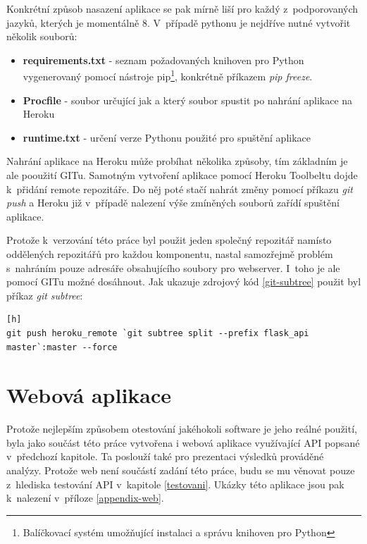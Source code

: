 \documentclass[thesis=B,czech]{FITthesis}[2012/06/26]
\begin{document}
Konkrétní způsob nasazení aplikace se pak mírně liší pro každý z~podporovaných jazyků, kterých je momentálně 8. V~případě pythonu je nejdříve nutné vytvořit několik souborů:

\begin{itemize}
\item \textbf{requirements.txt} - seznam požadovaných knihoven pro Python vygenerovaný pomocí nástroje pip\footnote{Balíčkovací systém umožňující instalaci a správu knihoven pro Python}, konkrétně příkazem \textit{pip freeze}.
\item \textbf{Procfile} - soubor určující jak a který soubor spustit po nahrání aplikace na Heroku
\item \textbf{runtime.txt} - určení verze Pythonu použité pro spuštění aplikace
\end{itemize}

Nahrání aplikace na Heroku může probíhat několika způsoby, tím základním je ale pooužití GITu. Samotným vytvoření aplikace pomocí Heroku Toolbeltu dojde k~přidání remote repozitáře. Do něj poté stačí nahrát změny pomocí příkazu \textit{git push} a Heroku již v~případě nalezení výše zmíněných souborů zařídí spuštění aplikace. 

Protože k~verzování této práce byl použit jeden společný repozitář namísto oddělených repozitářů pro každou komponentu, nastal samozřejmě problém s~nahráním pouze adresáře obsahujícího soubory pro webserver. I~toho je ale pomocí GITu možné dosáhnout. Jak ukazuje zdrojový kód \ref{git-subtree} použit byl příkaz \textit{git subtree}:


\begin{lstlisting}[caption={Příkaz pro nahrání podadresáře na Heroku},label=git-subtree][h]
git push heroku_remote `git subtree split --prefix flask_api master`:master --force
\end{lstlisting}



\section{Webová aplikace}
	Protože nejlepším způsobem otestování jakéhokoli software je jeho reálné použití, byla jako součást této práce vytvořena i webová aplikace využívající API popsané v~předchozí kapitole. Ta poslouží také pro prezentaci výsledků prováděné analýzy. Protože web není součástí zadání této práce, budu se mu věnovat pouze z~hlediska testování API v~kapitole \ref{testovani}. Ukázky této aplikace jsou pak k~nalezení v~příloze \ref{appendix-web}.  
	
\end{document}
